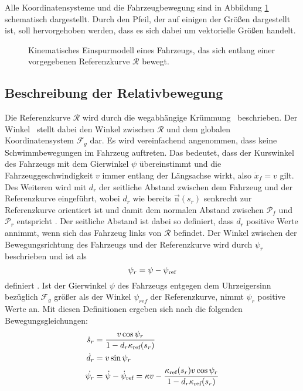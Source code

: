 Alle Koordinatensysteme und die Fahrzeugbewegung sind in Abbildung \ref{fig:Fahrzeugmodell} schematisch dargestellt. Durch den Pfeil, der auf einigen der Größen dargestellt ist, soll hervorgehoben werden, dass es sich dabei um vektorielle Größen handelt. 
\begin{figure}[h]
	\centering
	\fontsize{24pt}{16pt}\selectfont
	\caption{Kinematisches Einspurmodell eines Fahrzeugs, das sich entlang einer vorgegebenen Referenzkurve $\mathcal{R}$ bewegt. }
	\label{fig:Fahrzeugmodell}
\end{figure}

\subsection{Beschreibung der Relativbewegung}\label{subsec:Relativbewegung}
Die Referenzkurve $\mathcal{R}$ wird durch die wegabhängige Krümmung \kapparefofs~beschrieben. Der Winkel \psiref~stellt dabei den Winkel zwischen $\mathcal{R}$ und dem globalen Koordinatensystem $\mathcal{F}_g$ dar. Es wird vereinfachend angenommen, dass keine Schwimmbewegungen im Fahrzeug auftreten. Das bedeutet, dass der Kurswinkel des Fahrzeugs mit dem Gierwinkel $\psi$ übereinstimmt und die Fahrzeuggeschwindigkeit $v$ immer entlang der Längsachse wirkt, also $\dot{x}_f = v$ gilt. Des Weiteren wird mit $d_r$ der seitliche Abstand zwischen dem Fahrzeug und der Referenzkurve eingeführt, wobei $d_r$ wie bereits $\vec{\textrm{n}}(s_r)$ senkrecht zur Referenzkurve orientiert ist und damit dem normalen Abstand zwischen $\mathcal{P}_f$ und $\mathcal{P}_r$ entspricht \cite{Rathgeber.2016}. Der seitliche Abstand ist dabei so definiert, dass $d_r$ positive Werte annimmt, wenn sich das Fahrzeug links von $\mathcal{R}$ befindet. Der Winkel zwischen der Bewegungsrichtung des Fahrzeugs und der Referenzkurve wird durch $\psi_r$ beschrieben und ist als \begin{equation}
	\psi_r = \psi - \psi_{\textrm{ref}}
\end{equation}
definiert \cite{Rathgeber.2016}. Ist der Gierwinkel $\psi$ des Fahrzeugs entgegen dem Uhrzeigersinn bezüglich $\mathcal{F}_g$ größer als der Winkel $\psi_{ref}$ der Referenzkurve, nimmt $\psi_r$ positive Werte an. Mit diesen Definitionen ergeben sich nach \cite{Rathgeber.2016} die folgenden Bewegungsgleichungen:
\begin{align}
	\dot{s}_r &= \frac{v\cos{\psi_r}}{1-d_r\kappa_{\textrm{ref}}(s_r)} \label{eq:dsr} \\
	\dot{d}_r &= v\sin{\psi_r} \label{eq:ddr} \\
	\dot{\psi_r} &= \dot{\psi} -\dot{\psi}_\textrm{ref} = \kappa v - \frac{\kappa_{\textrm{ref}}(s_r) v\cos{\psi_r}}{1-d_r\kappa_{\textrm{ref}}(s_r)} \label{eq:dpsir}
\end{align}
